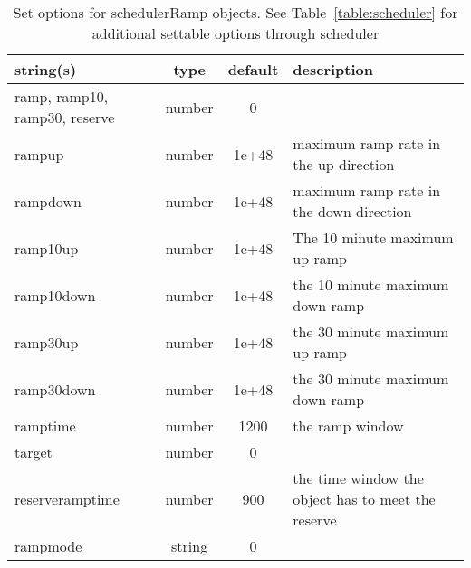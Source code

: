 \begin{table}[ht]
\centering
\begin{tabular}{p{5cm} c c p{7cm}}
\hline
string(s) & type & default & description \\
\hline
ramp, ramp10, ramp30, reserve & number & 0 & \\
rampup & number & 1e+48 & maximum ramp rate in the up direction\\
rampdown & number & 1e+48 & maximum ramp rate in the down direction\\
ramp10up & number & 1e+48 & The 10 minute maximum up ramp\\
ramp10down & number & 1e+48 & the 10 minute maximum down ramp\\
ramp30up & number & 1e+48 & the 30 minute maximum up ramp\\
ramp30down & number & 1e+48 & the 30 minute maximum down ramp\\
ramptime & number & 1200 & the ramp window\\
target & number & 0 & \\
reserveramptime & number & 900 & the time window the object has to meet the reserve\\
rampmode & string & 0 & \\
\hline
\end{tabular}
\caption{Set options for schedulerRamp objects. See Table~\ref{table:scheduler} for additional settable options through scheduler}
\label{table:schedulerRamp}
\end{table}

